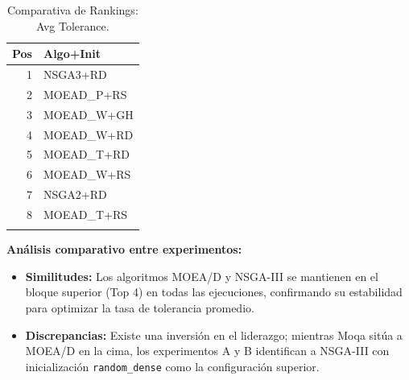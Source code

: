 \documentclass[a4paper,10pt]{article}
\begin{document}
\begin{table}[H]
\begin{minipage}[t]{0.32\textwidth}
        \begin{tabular}{rl}
            \toprule
            Pos & Algo+Init \\ \midrule
            1 & NSGA3+RD \\
            2 & MOEAD\_P+RS \\
            3 & MOEAD\_W+GH \\
            4 & MOEAD\_W+RD \\
            5 & MOEAD\_T+RD \\
            6 & MOEAD\_W+RS \\
            7 & NSGA2+RD \\
            8 & MOEAD\_T+RS \\
            \\
            \bottomrule
        \end{tabular}
    \end{minipage}
    \caption{Comparativa de Rankings: Avg Tolerance.}
\end{table}

\textbf{Análisis comparativo entre experimentos:}
\begin{itemize}
    \item \textbf{Similitudes:} Los algoritmos MOEA/D y NSGA-III se mantienen en el bloque superior (Top 4) en todas las ejecuciones, confirmando su estabilidad para optimizar la tasa de tolerancia promedio.
    \item \textbf{Discrepancias:} Existe una inversión en el liderazgo; mientras Moqa sitúa a MOEA/D en la cima, los experimentos A y B identifican a NSGA-III con inicialización \texttt{random\_dense} como la configuración superior.
\end{itemize}
\end{document}
